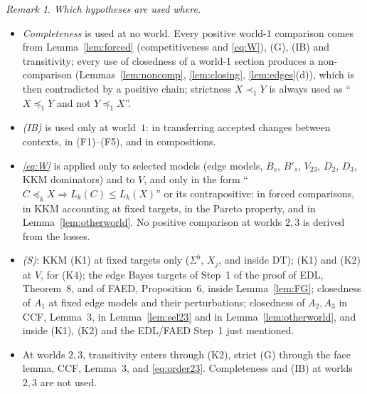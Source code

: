 \documentclass[11pt]{article}
\theoremstyle{definition}\newtheorem{definition}[theorem]{Definition}
\theoremstyle{remark}\newtheorem{remark}[theorem]{Remark}
\begin{document}
\begin{remark}\label{rem:uses}
\emph{Which hypotheses are used where.}
\begin{itemize}[leftmargin=*,itemsep=2pt]
\item \emph{Completeness} is used at no world. Every positive world-1
comparison comes from Lemma~\ref{lem:forced} (competitiveness and
\eqref{eq:W}), (G), (IB) and transitivity; every use of closedness of a
world-1 section produces a non-comparison (Lemmas~\ref{lem:noncomp},
\ref{lem:closing}, \ref{lem:edges}(d)), which is then contradicted by a
positive chain; strictness $X\prec_1Y$ is always used as ``$X\preceq_1Y$ and
not $Y\preceq_1X$''.
\item \emph{(IB)} is used only at world~$1$: in transferring accepted changes
between contexts, in (F1)--(F5), and in compositions.
\item \emph{\eqref{eq:W}} is applied only to selected models (edge models,
$B_s$, $B'_s$, $V_{23}$, $D_2$, $D_3$, KKM dominators) and to $V$, and only in
the form ``$C\preceq_kX\Rightarrow L_k(C)\le L_k(X)$'' or its contrapositive:
in forced comparisons, in KKM accounting at fixed targets, in the Pareto
property, and in Lemma~\ref{lem:otherworld}. No positive comparison at
worlds $2,3$ is derived from the losses.
\item \emph{(S)}: KKM (K1) at fixed targets only ($\Sigma^b$, $X_j$, and
inside DT); (K1) and (K2) at $V$, for (K4); the edge Bayes targets of
Step~1 of the proof of EDL, Theorem~8, and of FAED, Proposition~6, inside
Lemma~\ref{lem:FG}; closedness of $A_1$ at fixed edge models and their
perturbations; closedness of $A_2,A_3$ in CCF, Lemma~3, in
Lemma~\ref{lem:sel23} and in Lemma~\ref{lem:otherworld}, and inside
(K1), (K2) and the EDL/FAED Step~1 just mentioned.
\item At worlds $2,3$, transitivity enters through (K2), strict (G) through
the face lemma, CCF, Lemma~3, and \eqref{eq:order23}. Completeness and (IB)
at worlds $2,3$ are not used.
\end{itemize}
\end{remark}
\end{document}

